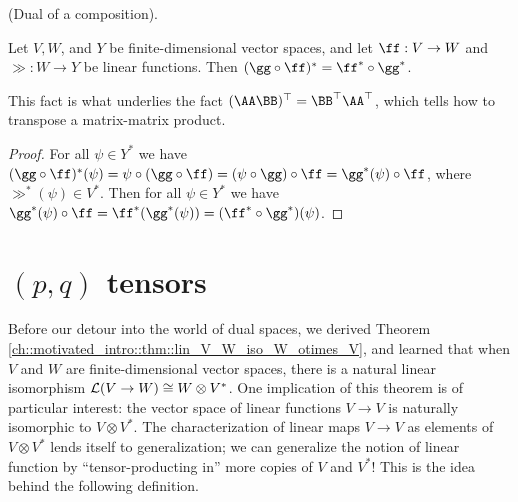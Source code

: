 \begin{theorem}
     (Dual of a composition).
     
     Let $V, W$, and $Y$ be finite-dimensional vector spaces, and let $\ff:V \rightarrow W$ and $\gg:W \rightarrow Y$ be linear functions. Then $(\gg \circ \ff)^* = \ff^* \circ \gg^*$. 
     
     This fact is what underlies the fact $(\AA \BB)^\top = \BB^\top \AA^\top$, which tells how to transpose a matrix-matrix product.
\end{theorem}

\begin{proof}
    For all $\psi \in Y^*$ we have $(\gg \circ \ff)^*(\psi) = \psi \circ (\gg \circ \ff) = (\psi \circ \gg) \circ \ff = \gg^*(\psi) \circ \ff$, where $\gg^*(\psi) \in V^*$. Then for all $\psi \in Y^*$ we have $\gg^*(\psi) \circ \ff = \ff^*(\gg^*(\psi)) = (\ff^* \circ \gg^*)(\psi)$.
\end{proof}

\newpage

\section{$(p, q)$ tensors}

Before our detour into the world of dual spaces, we derived Theorem \ref{ch::motivated_intro::thm::lin_V_W_iso_W_otimes_V}, and learned that when $V$ and $W$ are finite-dimensional vector spaces, there is a natural linear isomorphism $\mathcal{L}(V \rightarrow W) \cong W \otimes V^*$. One implication of this theorem is of particular interest: the vector space of linear functions $V \rightarrow V$ is naturally isomorphic to $V \otimes V^*$. The characterization of linear maps $V \rightarrow V$ as elements of $V \otimes V^*$ lends itself to generalization; we can generalize the notion of linear function by ``tensor-producting in'' more copies of $V$ and $V^*$! This is the idea behind the following definition.

